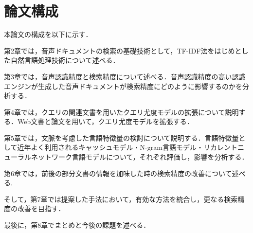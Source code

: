 \section{論文構成}
\noindent
本論文の構成を以下に示す．

第2章では，音声ドキュメントの検索の基礎技術として，TF-IDF法をはじめとした自然言語処理技術について述べる．

第3章では，音声認識精度と検索精度について述べる．音声認識精度の高い認識エンジンが生成した音声ドキュメントが検索精度にどのように影響するのかを分析する．

第4章では，クエリの関連文書を用いたクエリ尤度モデルの拡張について説明する．Web文書と論文を用いて，クエリ尤度モデルを拡張する．

第5章では，文脈を考慮した言語特徴量の検討について説明する．言語特徴量として近年よく利用されるキャッシュモデル・N-gram言語モデル・リカレントニューラルネットワーク言語モデルについて，それぞれ評価し，影響を分析する．

第6章では，前後の部分文書の情報を加味した時の検索精度の改善について述べる. 

そして，第7章では提案した手法において，有効な方法を統合し，更なる検索精度の改善を目指す． 

最後に，第8章でまとめと今後の課題を述べる．

